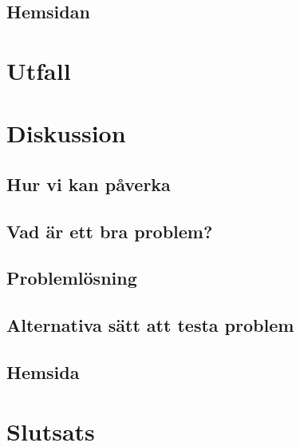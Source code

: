 \documentclass[11 pt,a4paper]{article}
\begin{document}
    \subsection{Hemsidan}
        

\section{Utfall}
    \label{sec:Utfall}
    

\section{Diskussion}

    \subsection{Hur vi kan påverka}
        
    
    \subsection{Vad är ett bra problem?}
        
        
    \subsection{Problemlösning}
        
        
    \subsection{Alternativa sätt att testa problem}
        
    
    \subsection{Hemsida}
        

\section{Slutsats}

\newpage
\begin{thebibliography}{3}
    
\end{thebibliography}
\end{document}
